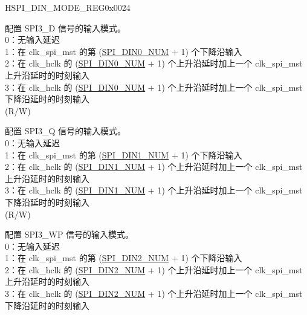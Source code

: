 \begin{register}{H}{SPI\_DIN\_MODE\_REG}{0x0024}\label{regdesc:SPI3DINMODEREG}
%
%
%
%
%
%
%
\regnewline%
\begin{regdesc}\begin{reglist}
\label{fielddesc:SPI3DIN0MODE}\item [SPI\_DIN0\_MODE] 配置 SPI3\_D 信号的输入模式。\\
0：无输入延迟\\
1：在 clk\_spi\_mst 的第 (\hyperref[fielddesc:SPI3DIN0NUM]{SPI\_DIN0\_NUM} + 1) 个下降沿输入\\
2：在 clk\_hclk 的 (\hyperref[fielddesc:SPI3DIN0NUM]{SPI\_DIN0\_NUM} + 1) 个上升沿延时加上一个 clk\_spi\_mst 上升沿延时的时刻输入\\
3：在 clk\_hclk 的 (\hyperref[fielddesc:SPIDIN0NUM]{SPI\_DIN0\_NUM} + 1) 个上升沿延时加上一个 clk\_spi\_mst 下降沿延时的时刻输入\\

(R/W)
\label{fielddesc:SPI3DIN1MODE}\item [SPI\_DIN1\_MODE] 配置 SPI3\_Q 信号的输入模式。\\
0：无输入延迟\\
1：在 clk\_spi\_mst 的第 (\hyperref[fielddesc:SPI3DIN1NUM]{SPI\_DIN1\_NUM} + 1) 个下降沿输入\\
2：在 clk\_hclk 的 (\hyperref[fielddesc:SPI3DIN1NUM]{SPI\_DIN1\_NUM} + 1) 个上升沿延时加上一个 clk\_spi\_mst 上升沿延时的时刻输入\\
3：在 clk\_hclk 的 (\hyperref[fielddesc:SPI3DIN1NUM]{SPI\_DIN1\_NUM} + 1) 个上升沿延时加上一个 clk\_spi\_mst 下降沿延时的时刻输入\\
 
(R/W)
\label{fielddesc:SPI3DIN2MODE}\item [SPI\_DIN2\_MODE] 配置 SPI3\_WP 信号的输入模式。\\
0：无输入延迟\\
1：在 clk\_spi\_mst 的第 (\hyperref[fielddesc:SPI3DIN2NUM]{SPI\_DIN2\_NUM} + 1) 个下降沿输入\\
2：在 clk\_hclk 的 (\hyperref[fielddesc:SPI3DIN2NUM]{SPI\_DIN2\_NUM} + 1) 个上升沿延时加上一个 clk\_spi\_mst 上升沿延时的时刻输入\\
3：在 clk\_hclk 的 (\hyperref[fielddesc:SPI3DIN2NUM]{SPI\_DIN2\_NUM} + 1) 个上升沿延时加上一个 clk\_spi\_mst 下降沿延时的时刻输入\\


\end{reglist}
\end{regdesc}
\end{register}
